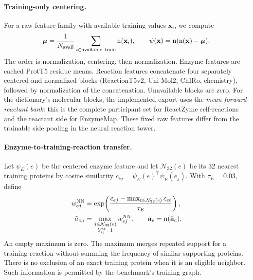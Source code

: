 \paragraph{Training-only centering.}
For a raw feature family with available training values $\mathbf{x}_i$, we compute
\begin{equation}
  \boldsymbol\mu=\frac{1}{N_{\mathrm{avail}}}\sum_{i\in\mathrm{available\ train}}\vunit{\mathbf{x}_i},
  \qquad \psi(\mathbf{x})=\vunit{\vunit{\mathbf{x}}-\boldsymbol\mu}.
  \label{eq:v4-center}
\end{equation}
The order is normalization, centering, then normalization. Enzyme features
are cached ProtT5 residue means. Reaction features concatenate four separately
centered and normalized blocks (ReactionT5v2, Uni-Mol2, ChIRo, chemistry),
followed by normalization of the concatenation. Unavailable blocks are zero.
For the dictionary's molecular blocks, the implemented export uses the
\emph{mean forward-reactant bank}: this is the complete participant set for
ReactZyme self-reactions and the reactant side for EnzymeMap. These fixed raw
features differ from the trainable side pooling in the neural reaction tower.

\paragraph{Enzyme-to-training-reaction transfer.}
Let $\psi_E(e)$ be the centered enzyme feature and let $\mathcal N_{32}(e)$
be its 32 nearest training proteins by cosine similarity
$c_{ej}=\psi_E(e)^\top\psi_E(e_j)$. With $\tau_E=0.03$, define
\begin{align}
  w_{ej}^{\mathrm{NN}}&=
    \exp\!\left(\frac{c_{ej}-\max_{t\in\mathcal N_{32}(e)}c_{et}}{\tau_E}\right),\\
  \tilde a_{e,i}&=
    \max_{\substack{j\in\mathcal N_{32}(e)\\Y^{\mathrm{tr}}_{ij}=1}}w_{ej}^{\mathrm{NN}},
  \qquad \mathbf{a}_e=\operatorname{n}(\tilde{\mathbf{a}}_e).
  \label{eq:v4-enzyme-dictionary}
\end{align}
An empty maximum is zero. The maximum merges repeated support for a training
reaction without summing the frequency of similar supporting proteins.
There is no exclusion of an exact training protein when it is an eligible
neighbor. Such information is permitted by the benchmark's training graph.

